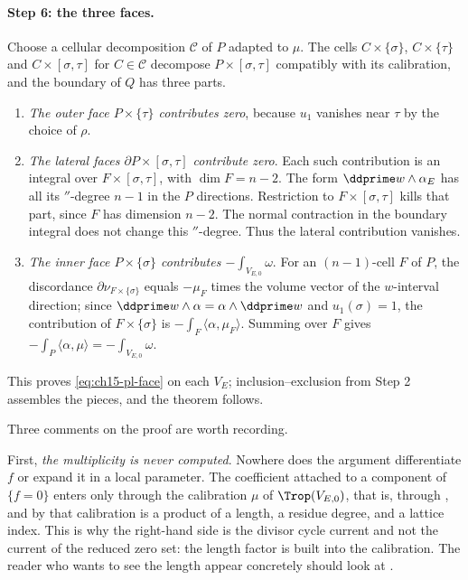 \paragraph{Step 6: the three faces.}
Choose a cellular decomposition $\mathscr C$ of $P$ adapted to $\mu$.  The
cells $C\times\{\sigma\}$, $C\times\{\tau\}$ and $C\times[\sigma,\tau]$ for
$C\in\mathscr C$ decompose $P\times[\sigma,\tau]$ compatibly with its
calibration, and the boundary of $Q$ has three parts.
\begin{enumerate}
\item \emph{The outer face $P\times\{\tau\}$ contributes zero}, because
    $u_1$ vanishes near $\tau$ by the choice of $\rho$.
\item \emph{The lateral faces $\partial P\times[\sigma,\tau]$ contribute
  zero}.  Each such contribution is an integral over $F\times[\sigma,\tau]$,
  with $\dim F=n-2$. The form $\ddprime w\wedge\alpha_E$ has all its
  $\dprime$-degree $n-1$ in the $P$ directions. Restriction to
  $F\times[\sigma,\tau]$ kills that part, since $F$ has dimension $n-2$.
  The normal contraction in the boundary integral does not change this
  $\dprime$-degree. Thus the lateral contribution vanishes.
\item \emph{The inner face $P\times\{\sigma\}$ contributes
  $-\int_{V_{E,0}}\omega$}.  For an $(n-1)$-cell $F$ of $P$, the discordance
  $\partial\nu_{F\times\{\sigma\}}$ equals $-\mu_F$ times the volume vector
  of the $w$-interval direction; since
  $\ddprime w\wedge\alpha=\alpha\wedge\ddprime w$ and $u_1(\sigma)=1$,
  the contribution of $F\times\{\sigma\}$
  is $-\int_F\langle\alpha,\mu_F\rangle$.  Summing over $F$ gives
  $-\int_P\langle\alpha,\mu\rangle=-\int_{V_{E,0}}\omega$.
\end{enumerate}
This proves \eqref{eq:ch15-pl-face} on each $V_E$; inclusion--exclusion from
Step 2 assembles the pieces, and the theorem follows.

Three comments on the proof are worth recording.

First, \emph{the multiplicity is never computed}.  Nowhere does the argument
differentiate $f$ or expand it in a local parameter.  The coefficient
attached to a component of $\{f=0\}$ enters only through the calibration
$\mu$ of $\Trop(V_{E,0})$, that is, through
, and by
 that calibration is a product of a
length, a residue degree, and a lattice index.  This is why the right-hand
side is the divisor cycle current and not the current of the reduced zero
set: the length factor is built into the calibration.  The reader who wants
to see the length appear concretely should look at
.

